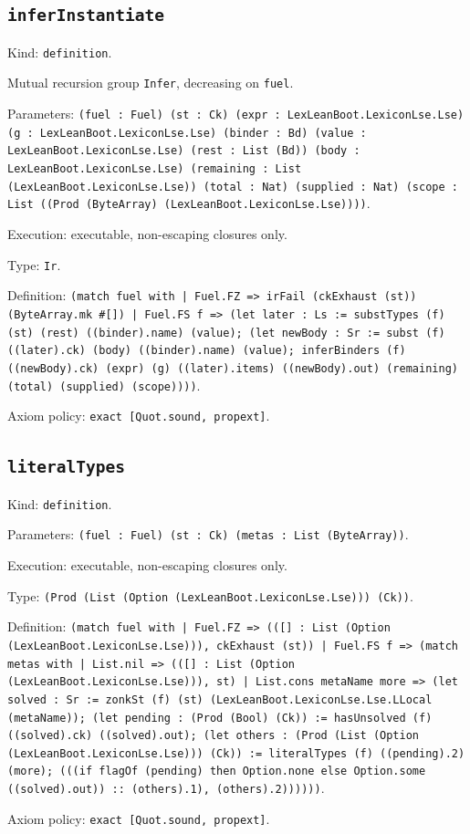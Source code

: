 \documentclass[11pt]{article}
\begin{document}
\subsection*{\texttt{inferInstantiate}}
\noindent Kind: \texttt{definition}.\par
\noindent Mutual recursion group \texttt{Infer}, decreasing on \texttt{fuel}.\par
\noindent Parameters: \texttt{(fuel : Fuel) (st : Ck) (expr : LexLeanBoot.LexiconLse.Lse) (g : LexLeanBoot.LexiconLse.Lse) (binder : Bd) (value : LexLeanBoot.LexiconLse.Lse) (rest : List (Bd)) (body : LexLeanBoot.LexiconLse.Lse) (remaining : List (LexLeanBoot.LexiconLse.Lse)) (total : Nat) (supplied : Nat) (scope : List ((Prod (ByteArray) (LexLeanBoot.LexiconLse.Lse))))}.\par
\noindent Execution: executable, non-escaping closures only.\par
\noindent Type: \texttt{Ir}.\par
\noindent Definition: \texttt{(match fuel with | Fuel.FZ => irFail (ckExhaust (st)) (ByteArray.mk \#[]) | Fuel.FS f => (let later : Ls := substTypes (f) (st) (rest) ((binder).name) (value); (let newBody : Sr := subst (f) ((later).ck) (body) ((binder).name) (value); inferBinders (f) ((newBody).ck) (expr) (g) ((later).items) ((newBody).out) (remaining) (total) (supplied) (scope))))}.\par
\noindent Axiom policy: \texttt{exact [Quot.sound, propext]}.\par
\subsection*{\texttt{literalTypes}}
\noindent Kind: \texttt{definition}.\par
\noindent Parameters: \texttt{(fuel : Fuel) (st : Ck) (metas : List (ByteArray))}.\par
\noindent Execution: executable, non-escaping closures only.\par
\noindent Type: \texttt{(Prod (List (Option (LexLeanBoot.LexiconLse.Lse))) (Ck))}.\par
\noindent Definition: \texttt{(match fuel with | Fuel.FZ => (([] : List (Option (LexLeanBoot.LexiconLse.Lse))), ckExhaust (st)) | Fuel.FS f => (match metas with | List.nil => (([] : List (Option (LexLeanBoot.LexiconLse.Lse))), st) | List.cons metaName more => (let solved : Sr := zonkSt (f) (st) (LexLeanBoot.LexiconLse.Lse.LLocal (metaName)); (let pending : (Prod (Bool) (Ck)) := hasUnsolved (f) ((solved).ck) ((solved).out); (let others : (Prod (List (Option (LexLeanBoot.LexiconLse.Lse))) (Ck)) := literalTypes (f) ((pending).2) (more); (((if flagOf (pending) then Option.none else Option.some ((solved).out)) :: (others).1), (others).2))))))}.\par
\noindent Axiom policy: \texttt{exact [Quot.sound, propext]}.\par
\end{document}
